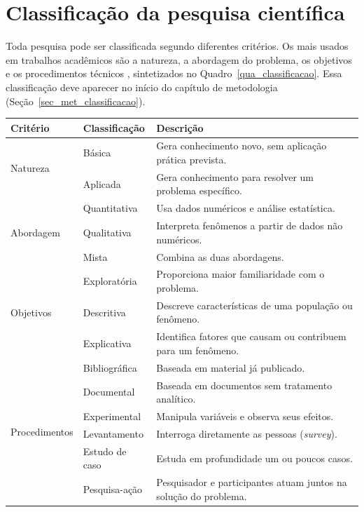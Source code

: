 \section{Classificação da pesquisa científica}
\label{sec_classificacao}

Toda pesquisa pode ser classificada segundo diferentes critérios. Os mais usados em trabalhos acadêmicos são a natureza, a abordagem do problema, os objetivos e os procedimentos técnicos \cite{gil2017projetos,marconi2017fundamentos}, sintetizados no Quadro~\ref{qua_classificacao}. Essa classificação deve aparecer no início do capítulo de metodologia (Seção~\ref{sec_met_classificacao}).

\begin{quadro}[htb]
	\centering
	\caption{Critérios de classificação da pesquisa.}
	\label{qua_classificacao}
	\small
	\begin{tabularx}{\textwidth}{|l|l|X|}
		\hline
		\textbf{Critério} & \textbf{Classificação} & \textbf{Descrição} \\ \hline
		\multirow{2}{*}{Natureza}
			& Básica & Gera conhecimento novo, sem aplicação prática prevista. \\ \cline{2-3}
			& Aplicada & Gera conhecimento para resolver um problema específico. \\ \hline
		\multirow{3}{*}{Abordagem}
			& Quantitativa & Usa dados numéricos e análise estatística. \\ \cline{2-3}
			& Qualitativa & Interpreta fenômenos a partir de dados não numéricos. \\ \cline{2-3}
			& Mista & Combina as duas abordagens. \\ \hline
		\multirow{3}{*}{Objetivos}
			& Exploratória & Proporciona maior familiaridade com o problema. \\ \cline{2-3}
			& Descritiva & Descreve características de uma população ou fenômeno. \\ \cline{2-3}
			& Explicativa & Identifica fatores que causam ou contribuem para um fenômeno. \\ \hline
		\multirow{6}{*}{Procedimentos}
			& Bibliográfica & Baseada em material já publicado. \\ \cline{2-3}
			& Documental & Baseada em documentos sem tratamento analítico. \\ \cline{2-3}
			& Experimental & Manipula variáveis e observa seus efeitos. \\ \cline{2-3}
			& Levantamento & Interroga diretamente as pessoas (\textit{survey}). \\ \cline{2-3}
			& Estudo de caso & Estuda em profundidade um ou poucos casos. \\ \cline{2-3}
			& Pesquisa-ação & Pesquisador e participantes atuam juntos na solução do problema. \\ \hline
	\end{tabularx}
\end{quadro}

